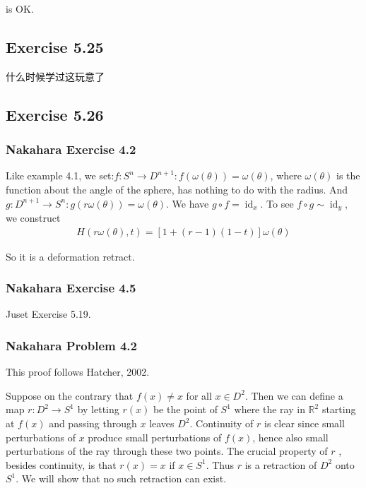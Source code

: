\documentclass[]{ctexart}
\begin{document}
			is OK. 
			
	\subsection{Exercise 5.25}
		什么时候学过这玩意了
		
	\subsection{Exercise 5.26}
		\subsubsection{Nakahara Exercise 4.2}
			Like example 4.1, we set:$f:S^n\to D^{n+1}:f(\omega(\theta))=\omega(\theta)$, where $\omega(\theta)$ is the function about the angle of the sphere, has nothing to do with the radius. And $g:D^{n+1}\to S^n:g(r\omega(\theta)) =\omega(\theta)$. We have $g\circ f=\operatorname{id}_x$. To see $f\circ g\sim \operatorname{id}_y$, we construct  
				\begin{equation*}
				\begin{aligned}
					H(r\omega(\theta),t)=[1+(r-1)(1-t)]\omega(\theta)
				\end{aligned}
				\end{equation*}
			
			So it is a deformation retract. 
		
		\subsubsection{Nakahara Exercise 4.5}
			Juset Exercise 5.19.
		
		\subsubsection{Nakahara Problem 4.2}
			This proof follows Hatcher, 2002. 
			
			Suppose on the contrary that $f(x) \neq x$ for all $x \in D^{2}$. Then we can define a map $r: D^{2} \rightarrow S^{1}$ by letting $r(x)$ be the point of $S^{1}$ where the ray in $\mathbb{R}^{2}$ starting at $f(x)$ and passing through $x$ leaves $D^{2}$. Continuity of $r$ is clear since small perturbations of $ x $ produce small perturbations of $f(x)$, hence
			also small perturbations of the ray through these two points.
			The crucial property of $ r $ , besides continuity, is that $r(x)=x$ if $x \in S^{1} .$ Thus $r$ is a retraction of $D^{2}$ onto $S^{1}$. We will show that no such retraction can exist.
			
\end{document}
